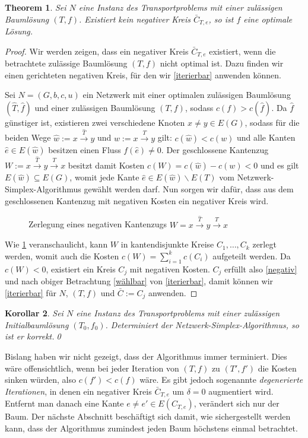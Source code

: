 \documentclass[a4paper,twoside,ngerman]{report}
\theoremstyle{plain}
\newtheorem{thm}{Theorem}
\newtheorem{kor}[thm]{Korollar}
\theoremstyle{definition}
\begin{document}
\begin{thm}\label{opt}Sei $N$ eine Instanz des Transportproblems mit einer zulässigen Baumlösung $(T,f)$. Existiert kein negativer Kreis $\bar{C}_{T,e}$, so ist $f$ eine optimale Lösung.\end{thm}
\begin{proof}Wir werden zeigen, dass ein negativer Kreis $\bar{C}_{T,e}$ existiert, wenn die betrachtete zulässige Baumlösung $(T,f)$ nicht optimal ist. Dazu finden wir einen gerichteten negativen Kreis, für den wir \cref{iterierbar} anwenden können.
	
Sei $N=(G,b,c,u)$ ein Netzwerk mit einer optimalen zulässigen Baumlösung $(\hat{T},\hat{f})$ und einer zulässigen Baumlösung $(T,f)$, sodass $c(f)>c(\hat{f})$. Da $\hat{f}$ günstiger ist, existieren zwei verschiedene Knoten $x\neq y\in E(G)$, sodass für die beiden Wege $\hat{w}:=x\xrightarrow{\hat{T}}y$ und $w:=x\xrightarrow{T}y$ gilt: $c(\hat{w})<c(w)$ und alle Kanten $\hat{e}\in E(\hat{w})$ besitzen einen Fluss $f(\hat{e})\neq0$. Der geschlossene Kantenzug $W:=x\xrightarrow{\hat{T}}y\xrightarrow{T}x$ besitzt damit Kosten $c(W)=c(\hat{w})-c(w)<0$ und es gilt $E(\hat{w})\subseteq E(G)$, womit jede Kante $\hat{e}\in E(\hat{w})\backslash E(T)$ vom Netzwerk-Simplex-Algorithmus gewählt werden darf. Nun sorgen wir dafür, dass aus dem geschlossenen Kantenzug mit negativen Kosten ein negativer Kreis wird.

\begin{figure}[!ht]\centering
	
\caption{Zerlegung eines negativen Kantenzugs $W=x\xrightarrow{\hat{T}}y\xrightarrow{T}x$}
\label{fig:decomp}
\end{figure}

Wie \cref{fig:decomp} veranschaulicht, kann $W$ in kantendisjunkte Kreise $C_1,\ldots,C_k$ zerlegt werden, womit auch die Kosten $c(W)=\sum_{i=1}^{k}c(C_i)$ aufgeteilt werden. Da $c(W)<0$, existiert ein Kreis $C_j$ mit negativen Kosten. $C_j$ erfüllt also \cref{negativ} und nach obiger Betrachtung \cref{wählbar} von \cref{iterierbar}, damit können wir \cref{iterierbar} für $N$, $(T,f)$ und $\bar{C}:=C_j$ anwenden.\end{proof}

\begin{kor}\label{korrekt}Sei $N$ eine Instanz des Transportproblems mit einer zulässigen Initialbaumlösung $(T_0,f_0)$. Determiniert der Netzwerk-Simplex-Algorithmus, so ist er korrekt.\qed\end{kor}

Bislang haben wir nicht gezeigt, dass der Algorithmus immer terminiert. Dies wäre offensichtlich, wenn bei jeder Iteration von $(T,f)$ zu $(T',f')$ die Kosten sinken würden, also $c(f')<c(f)$ wäre. Es gibt jedoch sogenannte \emph{degenerierte Iterationen}, in denen ein negativer Kreis $\bar{C}_{T,e}$ um $\delta=0$ augmentiert wird. Entfernt man danach eine Kante $e\neq e'\in E(C_{T,e})$, verändert sich nur der Baum. Der nächste Abschnitt beschäftigt sich damit, wie sichergestellt werden kann, dass der Algorithmus zumindest jeden Baum höchstens einmal betrachtet.
\end{document}

